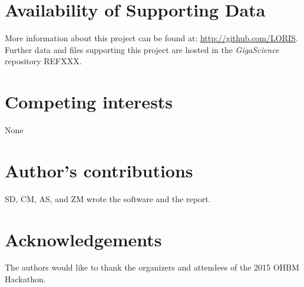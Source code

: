 \documentclass[twocolumn]{bmcart}%
\begin{document}
\begin{backmatter}

\section*{Availability of Supporting Data}
More information about this project can be found at: \url{http://github.com/LORIS}. Further data and files supporting this project are hosted in the \emph{GigaScience} repository REFXXX.

\section*{Competing interests}
None

\section*{Author's contributions}
SD, CM, AS, and ZM wrote the software and the report.

\section*{Acknowledgements}
The authors would like to thank the organizers and attendees of the 2015
OHBM Hackathon.

  
  


\end{backmatter}
\end{document}
